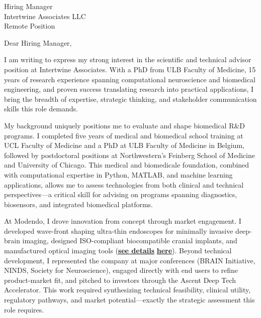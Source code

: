 \documentclass[11pt]{letter}
\date{December 9th, 2025}
\begin{document}
\begin{letter}{
Hiring Manager \\
Intertwine Associates LLC \\
Remote Position
}

\opening{\vspace{12mm}Dear Hiring Manager,}

\vspace{5mm}I am writing to express my strong interest in the scientific and technical advisor position at Intertwine Associates. With a PhD from ULB Faculty of Medicine, 15 years of research experience spanning computational neuroscience and biomedical engineering, and proven success translating research into practical applications, I bring the breadth of expertise, strategic thinking, and stakeholder communication skills this role demands.

My background uniquely positions me to evaluate and shape biomedical R\&D programs. I completed five years of medical and biomedical school training at UCL Faculty of Medicine and a PhD at ULB Faculty of Medicine in Belgium, followed by postdoctoral positions at Northwestern's Feinberg School of Medicine and University of Chicago. This medical and biomedicale foundation, combined with computational expertise in Python, MATLAB, and machine learning applications, allows me to assess technologies from both clinical and technical perspectives—a critical skill for advising on programs spanning diagnostics, biosensors, and integrated biomedical platforms.

At Modendo, I drove innovation from concept through market engagement. I developed wave-front shaping ultra-thin endoscopes for minimally invasive deep-brain imaging, designed ISO-compliant biocompatible cranial implants, and manufactured optical imaging tools (\href{https://lambot.co/project/chapter5/}{\underline{\textbf{see details}}} \href{https://lambot.co/project/chapter5/}{\underline{\textbf{here}}}). Beyond technical development, I represented the company at major conferences (BRAIN Initiative, NINDS, Society for Neuroscience), engaged directly with end users to refine product-market fit, and pitched to investors through the Ascent Deep Tech Accelerator. This work required synthesizing technical feasibility, clinical utility, regulatory pathways, and market potential—exactly the strategic assessment this role requires.


\end{letter}
\end{document}
